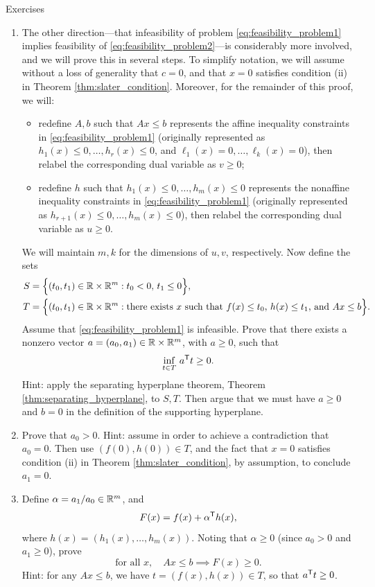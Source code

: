 \begin{xcb}{Exercises}
\begin{enumerate}[label=\thechapter.\arabic*]
\begin{enumerate}[label=\alph*.]
\item The other direction---that infeasibility of problem
  \eqref{eq:feasibility_problem1} implies feasibility of
  \eqref{eq:feasibility_problem2}---is considerably more involved, and we will
  prove this in several steps. To simplify notation, we will assume without a
  loss of generality that $c = 0$, and that $x = 0$ satisfies condition (ii) in
  Theorem \ref{thm:slater_condition}. Moreover, for the remainder of this proof,
  we will:    
  \begin{itemize}  
  \item redefine $A,b$ such that $Ax \leq b$ represents the affine inequality 
    constraints in \eqref{eq:feasibility_problem1} (originally represented as 
    $h_1(x) \leq 0, \dots, h_r(x) \leq 0$, and $\ell_1(x) = 0, \dots, \ell_k(x)
    = 0$), then relabel the corresponding dual variable as $v \geq 0$;     
  \item redefine $h$ such that $h_1(x) \leq 0, \dots, h_m(x) \leq 0$ represents 
    the nonaffine inequality constraints in \eqref{eq:feasibility_problem1}
    (originally represented as $h_{r+1}(x) \leq 0, \dots, h_m(x) \leq 0$), then
    relabel the corresponding dual variable as $u \geq 0$.  
  \end{itemize}
  We will maintain $m,k$ for the dimensions of $u,v$, respectively. Now define
  the sets     
  \begin{align*}
  S &= \Big\{ (t_0, t_1) \in \mathbb{R} \times \mathbb{R}^m : t_0 < 0, \, t_1 \leq 0 \Big\}, \\  
  T &= \Big\{ (t_0, t_1) \in \mathbb{R} \times \mathbb{R}^m : \text{there exists $x$ such that
      $f(x) \leq t_0$, $h(x) \leq t_1$, and $Ax \leq b$} \Big\}. 
  \end{align*}
  Assume that \eqref{eq:feasibility_problem1} is infeasible. Prove that there
  exists a nonzero vector $a = (a_0, a_1) \in \mathbb{R} \times \mathbb{R}^m$, with $a \geq 0$,
  such that  
  \[
  \inf_{t \in T} \, a^{\mathsf{T}} t \geq 0.  
  \]
  Hint: apply the separating hyperplane theorem, Theorem
  \ref{thm:separating_hyperplane}, to $S,T$. Then argue that we must have $a
  \geq 0$ and $b = 0$ in the definition of the supporting hyperplane. 

\item Prove that $a_0 > 0$. Hint: assume in order to achieve a contradiction 
  that $a_0 = 0$. Then use $(f(0), h(0)) \in T$, and the fact that $x = 0$
  satisfies condition (ii) in Theorem \ref{thm:slater_condition}, by assumption,
  to conclude $a_1 = 0$.
\item Define $\alpha = a_1 / a_0 \in \mathbb{R}^m$, and  
  \[
  F(x) = f(x) + \alpha^{\mathsf{T}} h(x),
  \]
  where $h(x) = (h_1(x), \dots, h_m(x))$. Noting that $\alpha \geq 0$ (since
  $a_0 > 0$ and $a_1 \geq 0$), prove
  \[
 \text{for all $x$}, \quad Ax \leq b \implies F(x) \geq 0.
  \]
  Hint: for any $Ax \leq b$, we have $t = (f(x), h(x)) \in T$, so that $a^{\mathsf{T}} t
  \geq 0$.


\end{enumerate}
\end{enumerate}
\end{xcb}
